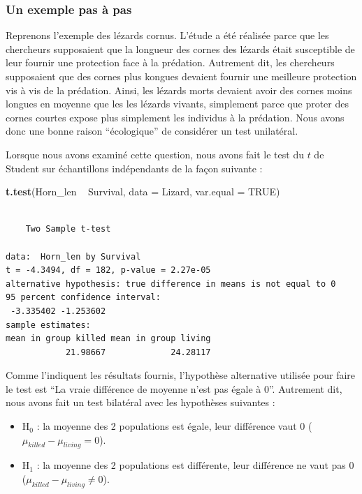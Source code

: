\documentclass[a4paperpaper,]{article}
\newenvironment{Shaded}{\begin{snugshade}}{\end{snugshade}}
\newcommand{\DataTypeTok}[1]{\textcolor[rgb]{0.00,0.34,0.68}{#1}}
\newcommand{\KeywordTok}[1]{\textcolor[rgb]{0.12,0.11,0.11}{\textbf{#1}}}
\newcommand{\NormalTok}[1]{\textcolor[rgb]{0.12,0.11,0.11}{#1}}
\newcommand{\OperatorTok}[1]{\textcolor[rgb]{0.12,0.11,0.11}{#1}}
\newcommand{\OtherTok}[1]{\textcolor[rgb]{0.00,0.43,0.16}{#1}}
\newcommand{\StringTok}[1]{\textcolor[rgb]{0.75,0.01,0.01}{#1}}
\providecommand{\tightlist}{%
  \setlength{\itemsep}{0pt}\setlength{\parskip}{0pt}}
\begin{document}
\hypertarget{un-exemple-pas-a-pas}{%
\subsubsection{Un exemple pas à pas}\label{un-exemple-pas-a-pas}}

Reprenons l'exemple des lézards cornus. L'étude a été réalisée parce que les chercheurs supposaient que la longueur des cornes des lézards était susceptible de leur fournir une protection face à la prédation. Autrement dit, les chercheurs supposaient que des cornes plus kongues devaient fournir une meilleure protection vis à vis de la prédation. Ainsi, les lézards morts devaient avoir des cornes moins longues en moyenne que les les lézards vivants, simplement parce que proter des cornes courtes expose plus simplement les individus à la prédation. Nous avons donc une bonne raison ``écologique'' de considérer un test unilatéral.

Lorsque nous avons examiné cette question, nous avons fait le test du \(t\) de Student sur échantillons indépendants de la façon suivante :

\begin{Shaded}
\begin{Highlighting}[]
\KeywordTok{t.test}\NormalTok{(Horn_len }\OperatorTok{~}\StringTok{ }\NormalTok{Survival, }\DataTypeTok{data =}\NormalTok{ Lizard, }\DataTypeTok{var.equal =} \OtherTok{TRUE}\NormalTok{)}
\end{Highlighting}
\end{Shaded}

\begin{verbatim}

    Two Sample t-test

data:  Horn_len by Survival
t = -4.3494, df = 182, p-value = 2.27e-05
alternative hypothesis: true difference in means is not equal to 0
95 percent confidence interval:
 -3.335402 -1.253602
sample estimates:
mean in group killed mean in group living 
            21.98667             24.28117 
\end{verbatim}

Comme l'indiquent les résultats fournis, l'hypothèse alternative utilisée pour faire le test est ``La vraie différence de moyenne n'est pas égale à 0''. Autrement dit, nous avons fait un test bilatéral avec les hypothèses suivantes :

\begin{itemize}
\tightlist
\item
  H\(_0\) : la moyenne des 2 populations est égale, leur différence vaut 0 (\(\mu_{killed}-\mu_{living} = 0\)).
\item
  H\(_1\) : la moyenne des 2 populations est différente, leur différence ne vaut pas 0 (\(\mu_{killed}-\mu_{living} \neq 0\)).
\end{itemize}
\end{document}
